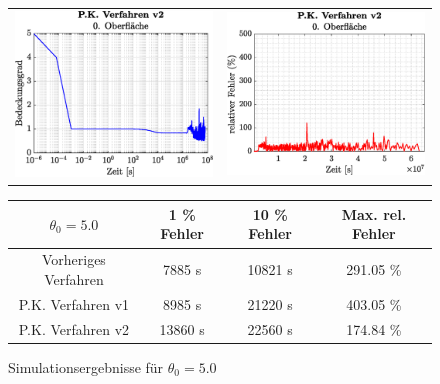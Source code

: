 \documentclass{listhesis}
\begin{document}
\begin{figure}[!h]
\begin{tabular}{@{}cc@{}}
\includegraphics[width=\wsss\textwidth]{./include/figure_5.0/PC_new/CovFacet0.eps}&
\includegraphics[width=\wsss\textwidth]{./include/figure_5.0/PC_new/CovFacetError0.eps}
\end{tabular}
\newline
\vspace*{0.5cm}
\newline
\begin{tabular}{|c|c|c|c|}
\hline
$\theta_0 = 5.0$ & 1 \% Fehler & 10 \% Fehler & Max. rel. Fehler\\
\hline
Vorheriges Verfahren & 7885 s & 10821 s & 291.05 \% \\
P.K. Verfahren v1 & 8985 s & 21220 s & 403.05 \% \\
P.K. Verfahren v2 & 13860 s & 22560 s & 174.84 \% \\
\hline
\end{tabular}
\caption{Simulationsergebnisse für $\theta_0 = 5.0$}
\label{fig:figure_5.0}
\end{figure}
\end{document}
